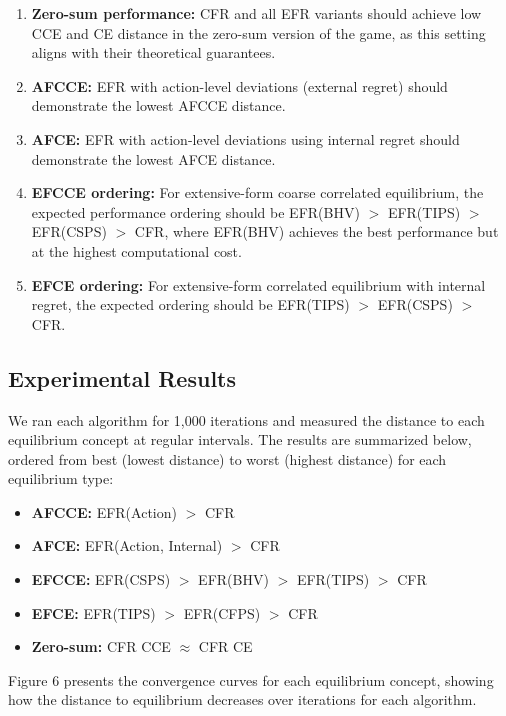 \documentclass[11pt]{article}
\begin{document}
\begin{enumerate}
    \item \textbf{Zero-sum performance:} CFR and all EFR variants should achieve low CCE and CE distance in the zero-sum version of the game, as this setting aligns with their theoretical guarantees.

    \item \textbf{AFCCE:} EFR with action-level deviations (external regret) should demonstrate the lowest AFCCE distance.

    \item \textbf{AFCE:} EFR with action-level deviations using internal regret should demonstrate the lowest AFCE distance.

    \item \textbf{EFCCE ordering:} For extensive-form coarse correlated equilibrium, the expected performance ordering should be EFR(BHV) $>$ EFR(TIPS) $>$ EFR(CSPS) $>$ CFR, where EFR(BHV) achieves the best performance but at the highest computational cost.

    \item \textbf{EFCE ordering:} For extensive-form correlated equilibrium with internal regret, the expected ordering should be EFR(TIPS) $>$ EFR(CSPS) $>$ CFR.
\end{enumerate}

\subsection{Experimental Results}

We ran each algorithm for 1,000 iterations and measured the distance to each equilibrium concept at regular intervals. The results are summarized below, ordered from best (lowest distance) to worst (highest distance) for each equilibrium type:

\begin{itemize}
    \item \textbf{AFCCE:} EFR(Action) $>$ CFR
    \item \textbf{AFCE:} EFR(Action, Internal) $>$ CFR
    \item \textbf{EFCCE:} EFR(CSPS) $>$ EFR(BHV) $>$ EFR(TIPS) $>$ CFR
    \item \textbf{EFCE:} EFR(TIPS) $>$ EFR(CFPS) $>$ CFR
    \item \textbf{Zero-sum:} CFR CCE $\approx$ CFR CE
\end{itemize}

Figure 6 presents the convergence curves for each equilibrium concept, showing how the distance to equilibrium decreases over iterations for each algorithm.
\end{document}
